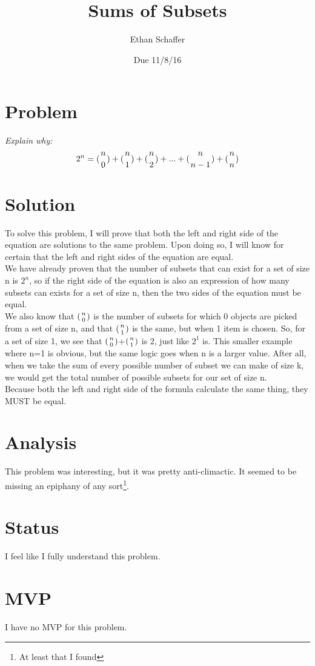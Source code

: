 \documentclass[11pt]{article} %
\title{Sums of Subsets}
\author{Ethan Schaffer}
\date{Due 11/8/16}
\newcommand\tab[1][1cm]{\hspace*{#1}}
\begin{document}
\maketitle
\section* {Problem}
\textit{Explain why:}
\begin{equation}
2^n = ({n\atop 0}) + ({n\atop 1}) + ({n\atop 2}) + ... + ({n\atop n-1}) + ({n\atop n})
\end{equation}

\section*{Solution}
\tab To solve this problem, I will prove that both the left and right side of the equation are solutions to the same problem. Upon doing so, I will know for certain that the left and right sides of the equation are equal. 
\\ \tab We have already proven that the number of subsets that can exist for a set of size n is $2^n$, so if the right side of the equation is also an expression of how many subsets can exists for a set of size n, then the two sides of the equation must be equal. 
\\ \tab We also know that $({n\atop 0})$ is the number of subsets for which 0 objects are picked from a set of size n, and that $({n\atop 1})$ is the same, but when 1 item is chosen. So, for a set of size 1, we see that $({n\atop 0})$+$({n\atop 1})$ is 2, just like $2^1$ is. This smaller example where n=1 is obvious, but the same logic goes when n is a larger value. After all, when we take the sum of every possible number of subset we can make of size k, we would get the total number of possible subsets for our set of size n. 
\\ \tab Because both the left and right side of the formula calculate the same thing, they MUST be equal. 

\section* {Analysis}
\tab This problem was interesting, but it was pretty anti-climactic. It seemed to be missing an epiphany of any sort\footnote{At least that I found}.

\section* {Status}
\tab I feel like I fully understand this problem.

\section* {MVP}
\tab I have no MVP for this problem.
\end{document}
